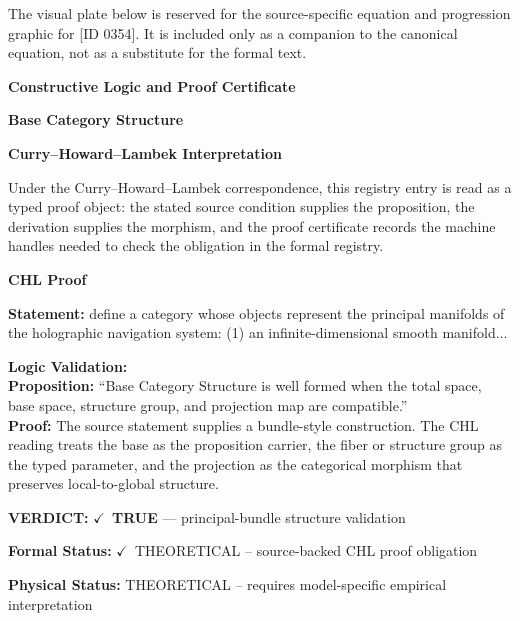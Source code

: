 \begingroup\footnotesize\sloppy
The visual plate below is reserved for the source-specific equation and progression graphic for [ID 0354]. It is included only as a companion to the canonical equation, not as a substitute for the formal text.
\par\endgroup
\ifTZPDarkEdition
{}
\fi

\clearpage
\begingroup\tzpsupportsetup
\noindent\textbf{\fontsize{10.8pt}{12.8pt}\selectfont [ID 0354] Constructive Logic and Proof Certificate}\par
\noindent\textbf{\fontsize{10pt}{12pt}\selectfont Base Category Structure}\par
\vspace{0.45em}
\begingroup
\footnotesize
\setlength{\parskip}{0.22em}
\setlength{\parindent}{0pt}
\noindent\textbf{Curry--Howard--Lambek Interpretation}\par
Under the Curry--Howard--Lambek correspondence, this registry entry is read as a typed proof
object: the stated source condition supplies the proposition, the derivation supplies the
morphism, and the proof certificate records the machine handles needed to check the obligation
in the formal registry.

\vspace{0.45em}
\noindent\textbf{CHL Proof}\par
\textbf{Statement:} define a category whose objects represent the principal manifolds of the holographic
navigation system: (1) an infinite-dimensional smooth manifold...

\textbf{Logic Validation:}\\
\textbf{Proposition:} ``Base Category Structure is well formed when the total space, base space, structure
group, and projection map are compatible.''\\
\textbf{Proof:} The source statement supplies a bundle-style construction. The CHL reading treats the
base as the proposition carrier, the fiber or structure group as the typed parameter,
and the projection as the categorical morphism that preserves local-to-global structure.

\textbf{VERDICT:} \ensuremath{\checkmark}\ \textbf{TRUE} --- principal-bundle structure validation

\textbf{Formal Status:} \ensuremath{\checkmark}\ THEORETICAL -- source-backed CHL proof obligation

\textbf{Physical Status:} THEORETICAL -- requires model-specific empirical interpretation
\par\vspace{0.45em}
\par
\ifTZPDarkEdition
{}
\fi
\endgroup
\endgroup
